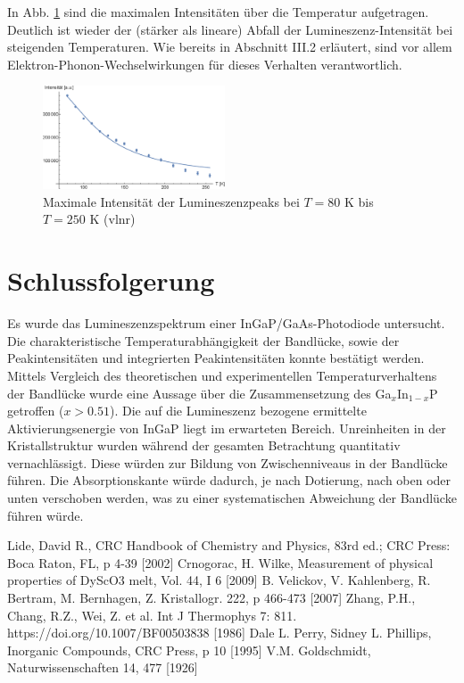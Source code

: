 \documentclass[aps,twocolumn,secnumarabic,nobalancelastpage,amsmath,amssymb,
nofootinbib,superscriptaddress]{revtex4-1}
\begin{document}
In Abb. \ref{fig:maxInt} sind die maximalen Intensitäten über die Temperatur aufgetragen. Deutlich ist wieder
der (stärker als lineare) Abfall der Lumineszenz-Intensität bei steigenden Temperaturen. Wie bereits in Abschnitt III.2 erläutert,
sind vor allem Elektron-Phonon-Wechselwirkungen für dieses Verhalten verantwortlich.

\begin{figure}[t]
  \centering
  \includegraphics[width=0.48\textwidth]{../Messung/maxintenstempfit.eps}
  \caption{\label{fig:maxInt}Maximale Intensität der Lumineszenzpeaks bei $T=80\text{ K}$ bis $T=250\text{ K}$ (vlnr)}
\end{figure}

\section{Schlussfolgerung}

\noindent Es wurde das Lumineszenzspektrum einer InGaP/GaAs-Photodiode untersucht. Die charakteristische Temperaturabhängigkeit der
Bandlücke, sowie der Peakintensitäten und integrierten Peakintensitäten konnte bestätigt werden. Mittels Vergleich des theoretischen
und experimentellen Temperaturverhaltens der Bandlücke wurde eine Aussage über die Zusammensetzung des Ga$_x$In$_{1-x}$P getroffen
($x>0.51$). Die auf die Lumineszenz bezogene ermittelte Aktivierungsenergie von InGaP liegt im erwarteten Bereich.
Unreinheiten in der Kristallstruktur wurden während der gesamten Betrachtung quantitativ vernachlässigt. Diese würden zur Bildung
von Zwischenniveaus in der Bandlücke führen. Die Absorptionskante würde dadurch, je nach Dotierung, nach oben oder unten verschoben werden, was
zu einer systematischen Abweichung der Bandlücke führen würde.



\begin{thebibliography}{99}
Lide, David R., CRC Handbook of Chemistry and Physics, 83rd ed.; CRC Press: Boca Raton, FL, p 4-39 [2002]
Crnogorac, H. Wilke, Measurement of physical properties of DyScO3 melt, Vol. 44, I 6 [2009]
B. Velickov, V. Kahlenberg, R. Bertram, M. Bernhagen, Z. Kristallogr. 222, p 466-473 [2007]
Zhang, P.H., Chang, R.Z., Wei, Z. et al. Int J Thermophys 7: 811. https://doi.org/10.1007/BF00503838 [1986]
Dale L. Perry, Sidney L. Phillips, Inorganic Compounds, CRC Press, p 10 [1995]
V.M. Goldschmidt, Naturwissenschaften 14, 477 [1926]
\end{thebibliography}


\clearpage
\appendix
\end{document}
